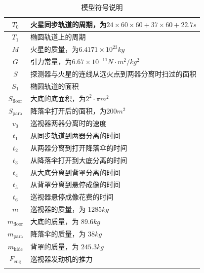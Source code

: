 \documentclass[hyperref,a4paper,UTF8]{ctexart}
\begin{document}
\begin{longtable}[h]{|c|p{10cm}|}
    \hline
    $T_0$              & 火星同步轨道的周期，为$24\times 60\times 60 + 37\times
    60 + 22.7s$                                                                 \\
    \hline
    $T_1$              & 椭圆轨道上的周期                                       \\
    \hline
    $M$                & 火星的质量，为$6.4171\times 10^{23}kg$                 \\
    \hline
    $G$                & 引力常量，为$6.67\times 10^{-11}N·m^2/kg^2$            \\
    \hline
    $S$                & 探测器与火星的连线从远火点到两器分离时扫过的面积       \\
    \hline
    $S_1$              & 椭圆轨道的面积                                         \\
    \hline
    $S_{\text{floor}}$ & 大底的底面积，为$2^2·\pi m^2$                          \\
    \hline
    $S_{\text{para}}$  & 降落伞打开后的面积，为$200m^2$                         \\
    \hline
    $v_0$              & 巡视器两器分离时的速度                                 \\
    \hline
    $t_1$              & 从同步轨道到两器分离的时间                             \\
    \hline
    $t_2$              & 从两器分离到打开降落伞的时间                           \\
    \hline
    $t_3$              & 从降落伞打开到大底分离的时间                           \\
    \hline
    $t_4$              & 从大底分离到背罩分离的时间                             \\
    \hline
    $t_5$              & 从背罩分离到悬停成像的时间                             \\
    \hline
    $t_6$              & 巡视器悬停成像花费的时间                               \\
    \hline
    $m$                & 巡视器的质量，为 $1285kg$                              \\
    \hline
    $m_{\text{floor}}$ & 大底的质量，为 $89.6kg$                                \\
    \hline
    $m_{\text{para}}$  & 降落伞的质量，为 $38kg$                                \\
    \hline
    $m_{\text{hide}}$  & 背罩的质量，为 $245.3kg$                               \\
    \hline
    $F_{\text{eng}}$   & 巡视器发动机的推力                                     \\
    \hline
    \caption{模型符号说明}
\end{longtable}
\end{document}
